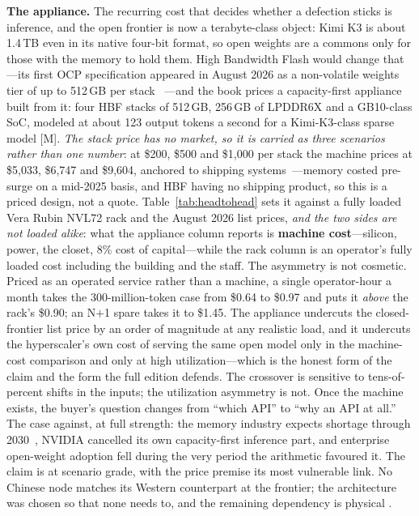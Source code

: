\textbf{The appliance.} The recurring cost that decides whether a defection sticks is inference, and the open frontier is now a terabyte-class object: Kimi K3 is about 1.4\,TB even in its native four-bit format, so open weights are a commons only for those with the memory to hold them. High Bandwidth Flash would change that---its first OCP specification appeared in August 2026 as a non-volatile weights tier of up to 512\,GB per stack~\cite{hbf-ocp,hbf-spec} ---and the book prices a capacity-first appliance built from it: four HBF stacks of 512\,GB, 256\,GB of LPDDR6X and a GB10-class SoC, modeled at about 123 output tokens a second for a Kimi-K3-class sparse model [M]. \emph{The stack price has no market, so it is carried as three scenarios rather than one number}: at \$200, \$500 and \$1,000 per stack the machine prices at \$5,033, \$6,747 and \$9,604, anchored to shipping systems~\cite{dgx-spark-price,framework-desktop}---memory costed pre-surge on a mid-2025 basis, and HBF having no shipping product, so this is a priced design, not a quote. Table~\ref{tab:headtohead} sets it against a fully loaded Vera Rubin NVL72 rack and the August 2026 list prices, \emph{and the two sides are not loaded alike}: what the appliance column reports is \textbf{machine cost}---silicon, power, the closet, 8\% cost of capital---while the rack column is an operator's fully loaded cost including the building and the staff. The asymmetry is not cosmetic. Priced as an operated service rather than a machine, a single operator-hour a month takes the 300-million-token case from \$0.64 to \$0.97 and puts it \emph{above} the rack's \$0.90; an N$+$1 spare takes it to \$1.45. The appliance undercuts the closed-frontier list price by an order of magnitude at any realistic load, and it undercuts the hyperscaler's own cost of serving the same open model only in the machine-cost comparison and only at high utilization---which is the honest form of the claim and the form the full edition defends. The crossover is sensitive to tens-of-percent shifts in the inputs; the utilization asymmetry is not. Once the machine exists, the buyer's question changes from ``which API'' to ``why an API at all.'' The case against, at full strength: the memory industry expects shortage through 2030~\cite{skhynix-shortage}, NVIDIA cancelled its own capacity-first inference part, and enterprise open-weight adoption fell during the very period the arithmetic favoured it. The claim is at scenario grade, with the price premise its most vulnerable link. No Chinese node matches its Western counterpart at the frontier; the architecture was chosen so that none needs to, and the remaining dependency is physical .

